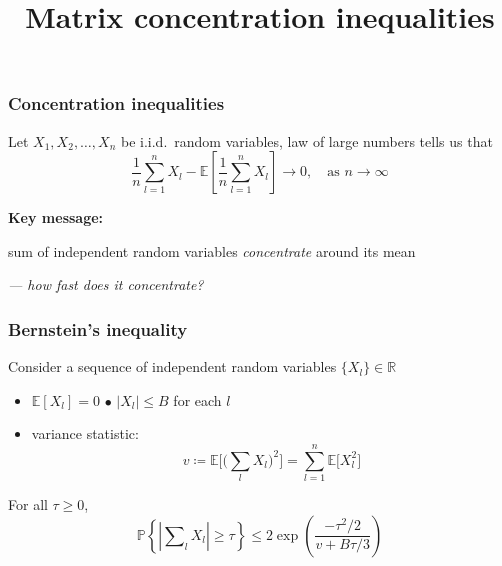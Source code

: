 \documentclass[compress,
mathserif,wide,%
]{beamer}
\title %
[Matrix concentration]{Matrix concentration inequalities}
\begin{document}
\begin{frame}[plain]
  \titlepage

\end{frame}


\begin{frame}
	\frametitle{Concentration inequalities}
	Let $X_{1}, X_{2}, \ldots, X_{n}$ be i.i.d.~random variables, law of large numbers tells us that
	\[
	\frac{1}{n}\sum_{l=1}^{n} X_{l} - \mathbb{E} \left[ \frac{1}{n}\sum_{l=1}^{n} X_{l} \right] \rightarrow 0, \quad \text{as }n \rightarrow \infty
	\]
	
	\vfill
		{

\begin{varblock}[\textwidth]{}
{\bf Key message: }\\
\begin{center}
sum of independent random variables \emph{concentrate} around its mean
\end{center}
\end{varblock}

}

{\hfill \em --- how fast does it concentrate?}
\end{frame}

\begin{frame}
	\frametitle{Bernstein's inequality}
	Consider a sequence of independent random variables $\{X_{l}\} \in \mathbb{R}$
%
\begin{itemize}
	\itemsep0.5em
	\item $\mathbb{E}[{X}_l]=0$ \qquad\qquad\qquad\qquad\qquad $\bullet$ $|{X}_{l}|\leq B$ for each $l$
	\item variance statistic: 
	$$v \coloneqq \mathbb{E} \big [ \big (\sum_{l} X_l \big)^{2} \big] = \sum_{l=1}^{n} \mathbb{E} \big [X_{l}^{2} \big]$$
\end{itemize}

\begin{theorem}\label{thm:mtx-Bernstein}
%
For all $\tau \geq 0$,
\vspace{-1em}
\[
\mathbb{P}\left\{ \left| \sum\nolimits_{l}{X}_{l}\right| \geq \tau\right\} \leq  2 \exp\left(\frac{-\tau^{2}/2}{v+B\tau/3}\right)
\]
%
\end{theorem}
\end{frame}
\end{document}
